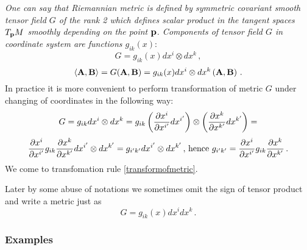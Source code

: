 \documentclass[12pt]{article}
\theoremstyle{theorem}
\numberwithin{equation}{section}
\begin{document}
{\it One can say that Riemannian metric is defined by  
symmetric covariant smooth tensor field $G$ of the rank 2
which defines scalar product in the tangent spaces $T_{{\bf p}}M$ 
  smoothly depending on the point ${\bf p}$.
 Components of tensor field  $G$ in coordinate system are 
functions $g_{ik}(x)$}:
\begin{equation*}\label{symb}
    G=g_{ik}(x)dx^i\otimes dx^k\,,
\end{equation*}
             \begin{equation}\label{geommeaning}
 \langle {\bf A},{\bf B}\rangle=G({\bf A},{\bf B})=
  g_{ik}(x)dx^i\otimes dx^k
             \left(
  {\bf A},{\bf B}
          \right)\,.
                 \end{equation}
In practice it is more convenient to perform transformation
of metric $G$ under changing of coordinates in the following way:
       \begin{equation*}
        G=g_{ik}dx^i\otimes dx^k=g_{ik}
        \left({\partial x^i\over \partial x^{i'}}dx^{i'}\right)
        \otimes
        \left({\partial x^k\over \partial x^{k'}}dx^{k'}\right)=
    \end{equation*}
   \begin{equation}\label{transformationlaw}
         {\partial x^i\over \partial x^{i'}}g_{ik}{\partial x^k\over \partial x^{k'}}
        dx^{i'}
        \otimes dx^{k'}=
        g_{i'k'}
        dx^{i'}
        \otimes dx^{k'}\,,\,{\rm hence}\,\,
g_{i'k'}={\partial x^i\over \partial x^{i'}}g_{ik}{\partial x^k\over \partial x^{k'}}\,.
            \end{equation}
We come to transfomation rule \eqref{transformofmetric}.




Later by some abuse of notations we sometimes omit the sign of tensor product
and write a metric just as
\begin{equation*}\label{symb1}
    G=g_{ik}(x)dx^idx^k\,.
\end{equation*}


                               
\subsubsection{Examples}
\end{document}
